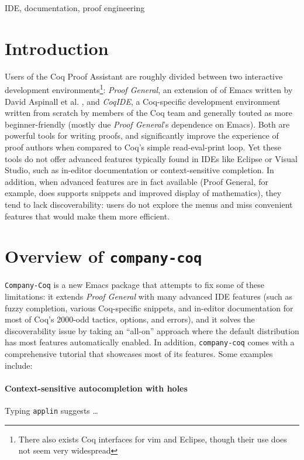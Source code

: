 \documentclass[preprint]{sigplanconf}
\begin{document}
\keywords IDE, documentation, proof engineering

\section*{Introduction}

Users of the Coq Proof Assistant \cite{Coq} are roughly divided between two interactive development environments\footnote{There also exists Coq interfaces for vim and Eclipse, though their use does not seem very widespread}: \emph{Proof General}, an extension of of Emacs written by David Aspinall et al. \cite{ProofGeneral}, and \emph{CoqIDE}, a Coq-specific development environment written from scratch by members of the Coq team and generally touted as more beginner-friendly (mostly due \emph{Proof General}'s dependence on Emacs). Both are powerful tools for writing proofs, and significantly improve the experience of proof authors when compared to Coq's simple read-eval-print loop. Yet these tools do not offer advanced features typically found in IDEs like Eclipse or Visual Studio, such as in-editor documentation or context-sensitive completion. In addition, when advanced features are in fact available (Proof General, for example, does supports snippets and improved display of mathematics), they tend to lack discoverability: users do not explore the menus and miss convenient features that would make them more efficient.

\section*{Overview of \texttt{company-coq}}

\texttt{Company-Coq} is a new Emacs package that attempts to fix some of these limitations: it extends \emph{Proof General} with many advanced IDE features (such as fuzzy completion, various Coq-specific snippets, and in-editor documentation for most of Coq's 2000-odd tactics, options, and errors), and it solves the discoverability issue by taking an ``all-on'' approach where the default distribution has most features automatically enabled. In addition, \texttt{company-coq} comes with a comprehensive tutorial that showcases most of its features. Some examples include:

\paragraph{Context-sensitive autocompletion with holes} Typing \texttt{applin} suggests \ldots
\end{document}
